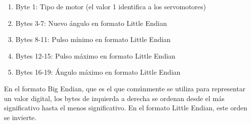 \begin{enumerate}
	\item Byte 1: Tipo de motor (el valor 1 identifica a los servomotores)
	\item Bytes 3-7: Nuevo ángulo en formato Little Endian
	\item Bytes 8-11: Pulso mínimo en formato Little Endian
	\item Bytes 12-15: Pulso máximo en formato Little Endian
	\item Bytes 16-19: Ángulo máximo en formato Little Endian
\end{enumerate}

En el formato Big Endian, que es el que comúnmente se utiliza para representar un valor digital, los bytes de izquierda a derecha se ordenan desde el más significativo hasta el menos significativo. En el formato Little Endian, este orden se invierte.